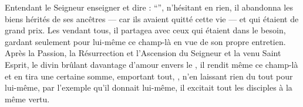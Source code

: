 Entendant le Seigneur enseigner et dire :
\enquote{},
n'hésitant en rien,
il abandonna les biens hérités de ses ancêtres --- car ils avaient quitté cette vie --- et qui étaient  de grand prix. 
Les vendant tous, 
il partagea avec ceux qui étaient dans le besoin, 
gardant seulement pour lui-même ce champ-là en vue de son propre entretien. 
Après la Passion, la Résurrection et l'Ascension du Seigneur et la venu Saint Esprit,
le divin  brûlant davantage d'amour envers le , 
il rendit même ce champ-là et en tira une certaine somme, 
emportant tout,
,
n'en laissant rien du tout pour lui-même,
par l'exemple qu'il donnait lui-même, il excitait tout les  disciples à la même vertu. %

